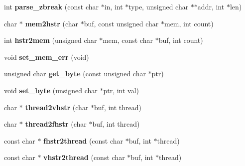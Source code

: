 \begin{DoxyCompactItemize}
\item 
\mbox{\label{group__lm32__gdb_gaa38f73303fc0ca4067db5ebce2adb52b}} 
int {\bfseries parse\+\_\+zbreak} (const char $\ast$in, int $\ast$type, unsigned char $\ast$$\ast$addr, int $\ast$len)
\item 
\mbox{\label{group__lm32__gdb_gae2de6a9c95549019795eee57ed3aaabf}} 
char $\ast$ {\bfseries mem2hstr} (char $\ast$buf, const unsigned char $\ast$mem, int count)
\item 
\mbox{\label{group__lm32__gdb_ga0bcf4ff123cbc3dc18a92ecba66964ce}} 
int {\bfseries hstr2mem} (unsigned char $\ast$mem, const char $\ast$buf, int count)
\item 
\mbox{\label{group__lm32__gdb_gaca7491697b19b8aa78e1ee6379ecea55}} 
void {\bfseries set\+\_\+mem\+\_\+err} (void)
\item 
\mbox{\label{group__lm32__gdb_gada2c605285d5651291de4aca4ac3e4ea}} 
unsigned char {\bfseries get\+\_\+byte} (const unsigned char $\ast$ptr)
\item 
\mbox{\label{group__lm32__gdb_gab72f528bc519f5fb86e7ba497710875c}} 
void {\bfseries set\+\_\+byte} (unsigned char $\ast$ptr, int val)
\item 
\mbox{\label{group__lm32__gdb_gae3855ba6afc4392cd4798c3451926306}} 
char $\ast$ {\bfseries thread2vhstr} (char $\ast$buf, int thread)
\item 
\mbox{\label{group__lm32__gdb_ga9b4dd3a10bc2652c14ea1d461610a3df}} 
char $\ast$ {\bfseries thread2fhstr} (char $\ast$buf, int thread)
\item 
\mbox{\label{group__lm32__gdb_ga66b6ba191d6583327af488e3df116075}} 
const char $\ast$ {\bfseries fhstr2thread} (const char $\ast$buf, int $\ast$thread)
\item 
\mbox{\label{group__lm32__gdb_gaefd53f8d98d706cdd2a73349ac413948}} 
const char $\ast$ {\bfseries vhstr2thread} (const char $\ast$buf, int $\ast$thread)
$$
\end{DoxyCompactItemize}
